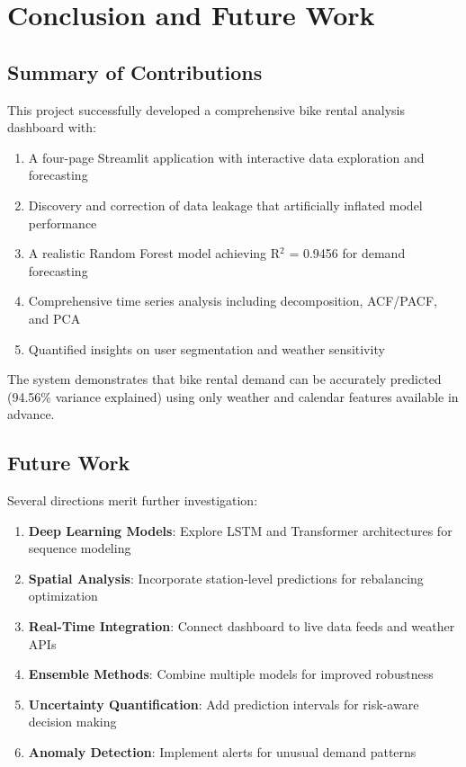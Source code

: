 \documentclass[12pt,a4paper]{article}
\begin{document}
\section{Conclusion and Future Work}

\subsection{Summary of Contributions}

This project successfully developed a comprehensive bike rental analysis dashboard with:

\begin{enumerate}
    \item A four-page Streamlit application with interactive data exploration and forecasting
    \item Discovery and correction of data leakage that artificially inflated model performance
    \item A realistic Random Forest model achieving R$^2$ = 0.9456 for demand forecasting
    \item Comprehensive time series analysis including decomposition, ACF/PACF, and PCA
    \item Quantified insights on user segmentation and weather sensitivity
\end{enumerate}

The system demonstrates that bike rental demand can be accurately predicted (94.56\% variance explained) using only weather and calendar features available in advance.

\subsection{Future Work}

Several directions merit further investigation:

\begin{enumerate}
    \item \textbf{Deep Learning Models}: Explore LSTM and Transformer architectures for sequence modeling
    \item \textbf{Spatial Analysis}: Incorporate station-level predictions for rebalancing optimization
    \item \textbf{Real-Time Integration}: Connect dashboard to live data feeds and weather APIs
    \item \textbf{Ensemble Methods}: Combine multiple models for improved robustness
    \item \textbf{Uncertainty Quantification}: Add prediction intervals for risk-aware decision making
    \item \textbf{Anomaly Detection}: Implement alerts for unusual demand patterns
\end{enumerate}
\end{document}
